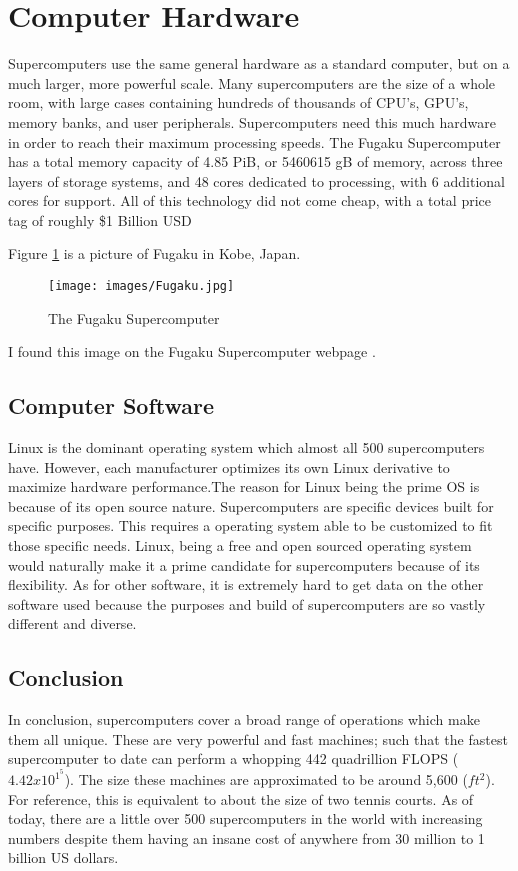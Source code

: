 \documentclass[11pt, twocolumn]{article}
\begin{document}
\section{Computer Hardware}
Supercomputers use the same general hardware as a standard computer, but on a much larger, more powerful scale. Many supercomputers are the size of a whole room, with large cases containing hundreds of thousands of CPU's, GPU's, memory banks, and user peripherals. Supercomputers need this much hardware in order to reach their maximum processing speeds. The Fugaku Supercomputer has a total memory capacity of 4.85 PiB, or 5460615 gB of memory, across three layers of storage systems, and 48 cores dedicated to processing, with 6 additional cores for support. All of this technology did not come cheap, with a total price tag of roughly \$1 Billion USD 

Figure \ref{fig:Fugaku} is a picture of Fugaku in Kobe, Japan.
\begin{figure}
    \centering
    \texttt{[image: images/Fugaku.jpg]}
    \caption{The Fugaku Supercomputer}
    \label{fig:Fugaku}
\end{figure}

I found this image on the Fugaku Supercomputer webpage \cite{fugaku}. 

\subsection{Computer Software}
Linux is the dominant operating system which almost all 500 supercomputers have. However, each manufacturer optimizes its own Linux derivative to maximize hardware performance.The reason for Linux being the prime OS is because of its open source nature. Supercomputers are specific devices built for specific purposes. This requires a operating system able to be customized to fit those specific needs. Linux, being a free and open sourced operating system would naturally make it a prime candidate for supercomputers because of its flexibility. As for other software, it is extremely hard to get data on the other software used because the purposes and build of supercomputers are so vastly different and diverse.

\subsection{Conclusion}
In conclusion, supercomputers cover a broad range of operations which make them all unique. These are very powerful and fast machines; such that the fastest supercomputer to date can perform a whopping 442 quadrillion FLOPS (\begin{math}4.42x10^1^5\end{math}). The size these machines are approximated to be around 5,600 (\begin{math}ft^2\end{math}). For reference, this is equivalent to about the size of two tennis courts. As of today, there are a little over 500 supercomputers in the world with increasing numbers despite them having an insane cost of anywhere from 30 million to 1 billion US dollars.




\cite{NAS}
\cite{fugaku}
\cite{Brit}
\cite{suse}
\end{document}
